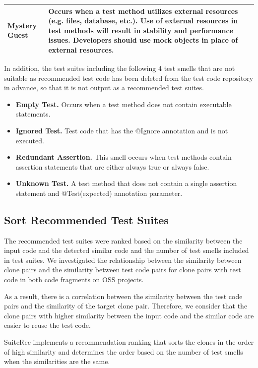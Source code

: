 \documentclass[conference]{IEEEtran}
\begin{document}
\begin{table}[hbtp]
\begin{tabular}{|l|p{5.2cm}|}
\textbf{Mystery Guest}          & Occurs when a test method utilizes external resources (e.g. files, database, etc.). Use of external resources in test methods will result in stability and performance issues. Developers should use mock objects in place of external resources. \\ \hline
\end{tabular}
\end{table}

In addition, the test suites including the following 4 test smells that are not suitable as recommended test code has been deleted from the test code repository in advance, so that it is not output as a recommended test suites.　

\begin{itemize}
\item \textbf{Empty Test. }Occurs when a test method does not contain executable statements.
\item \textbf{Ignored Test. }Test code that has the @Ignore annotation and is not executed.
\item \textbf{Redundant Assertion. }This smell occurs when test methods contain assertion statements that are either always true or always false. 
\item \textbf{Unknown Test. }A test method that does not contain a single assertion statement and @Test(expected) annotation parameter.
\end{itemize}

\subsection{Sort Recommended Test Suites}
The recommended test suites were ranked based on the similarity between the input code and the detected similar code and the number of test smells included in test suites. We investigated the relationship between the similarity between clone pairs and the similarity between test code pairs for clone pairs with test code in both code fragments on OSS projects.

As a result, there is a correlation between the similarity between the test code pairs and the similarity of the target clone pair. Therefore, we consider that the clone pairs with higher similarity between the input code and the similar code are easier to reuse the test code.

SuiteRec implements a recommendation ranking that sorts the clones in the order of high similarity and determines the order based on the number of test smells when the similarities are the same.
\end{document}
